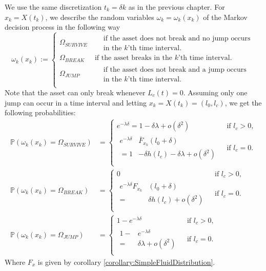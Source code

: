 \documentclass[a4paper]{thesis}
\theoremstyle{definition}
\begin{document}
We use the same discretization $t_k=\delta k$ as in the previous chapter.
For $x_k=X(t_k)$, we describe the random variables $\omega_k=\omega_k(x_k)$ of the Markov decision process in the following way
\[
\omega_k(x_k):=\begin{cases}
\Omega_{SURVIVE}&\ \begin{split}&\text{if the asset does not break and no jump occurs}\\
&\text{in the $k$'th time interval.}\end{split}\\
\Omega_{BREAK}&\ \text{if the asset breaks in the $k$'th time interval.}\\
\Omega_{JUMP}&\ \begin{split}&\text{if the asset does not break and a jump occurs}\\
&\text{in the $k$'th time interval.}\end{split}\\
\end{cases}
\]
Note that the asset can only break whenever $L_c(t)=0$.
Assuming only one jump can occur in a time interval and letting $x_k=X(t_k)=(l_0,l_c)$, we get the following probabilities:
\[
\begin{split}
\mathbb{P}(\omega_k(x_k)=\Omega_{SURVIVE})&=\begin{cases}
e^{-\lambda \delta}=1-\delta\lambda+o(\delta^2)&\text{ if }l_c>0,\\
\begin{split}
e^{-\lambda \delta} & \bar{F}_{x_k}(l_0+\delta)\\
=1&-\delta h(l_c)-\delta\lambda+o(\delta^2)
\end{split}&\text{ if }l_c=0.\\
\end{cases}\\
\mathbb{P}(\omega_k(x_k)=\Omega_{BREAK})&=\begin{cases}
0&\text{ if }l_c>0,\\
\begin{split}
e^{-\lambda \delta}F_{x_k}&(l_0+\delta)\\
=&\delta h(l_c)+o(\delta^2)
\end{split}&\text{ if }l_c=0.\\
\end{cases}\\
\mathbb{P}(\omega_k(x_k)=\Omega_{JUMP})&=\begin{cases}
1-e^{-\lambda \delta} & \text{ if }l_c>0,\\
\begin{split}
1-&e^{-\lambda \delta}\\
=&\delta\lambda+o(\delta^2)
\end{split}&\text{ if }l_c=0.\\
\end{cases}
\end{split}
\]
Where $F_x$ is given by corollary \ref{corollary:SimpleFluidDistribution}.
\end{document}
